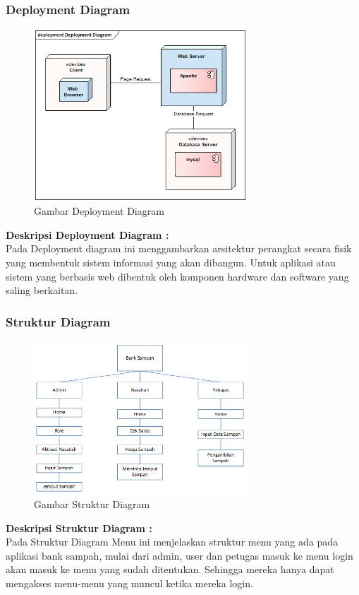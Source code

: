 \subsubsection{Deployment Diagram}
	\begin{figure}[H]
		\includegraphics[width=8cm]{figures/analisis/16.png}
		\centering
		\caption{Gambar Deployment Diagram}
	\end{figure}
	\textbf{Deskripsi Deployment Diagram :}
\hfill\\
Pada Deployment diagram ini menggambarkan arsitektur perangkat secara fisik yang membentuk sistem informasi yang akan dibangun. Untuk aplikasi atau sistem yang berbasis web dibentuk oleh komponen hardware dan software yang saling berkaitan.

\subsubsection{Struktur Diagram}
	\begin{figure}[H]
		\includegraphics[width=8cm]{figures/analisis/17.png}
		\centering
		\caption{Gambar Struktur Diagram}
	\end{figure}
	\textbf{Deskripsi Struktur Diagram :}
\hfill\\
Pada Struktur Diagram Menu ini menjelaskan struktur menu yang ada pada aplikasi bank sampah, mulai dari admin, user dan petugas masuk ke menu login akan masuk ke menu yang sudah ditentukan. Sehingga mereka hanya dapat mengakses menu-menu yang muncul ketika mereka login.

